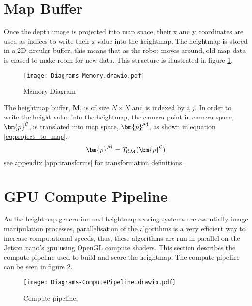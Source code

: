     \section{Map Buffer}
        Once the depth image is projected into map space, their x and y coordinates are used as indices to write their z value into the heightmap. The heightmap is stored in
        a 2D circular buffer, this means that as the robot moves around, old map data is erased to make room for new data. This structure is illustrated in figure \ref{fig:memory}.
        \begin{figure}[h]
            \centering
            \texttt{[image: Diagrams-Memory.drawio.pdf]}
            \caption{Memory Diagram}
            \label{fig:memory}
        \end{figure}

        The heightmap buffer, \(\bm{M}\), is of size \(N \times N\) and is indexed by \(i,j\). In order to write the height value into the heightmap, the camera point in camera space,
        \(\bm{p}\inrefframe{\fcamera}\), is translated into map space, \(\bm{p}\inrefframe{\fmap}\), as shown in equation \ref{eq:project_to_map},
        \begin{equation} \label{eq:project_to_map}
            \bm{p}\inrefframe{\fmap} = \transframe{\bm{p}\inrefframe{\fcamera}}{\fcamera}{\fmap}
        \end{equation}
        see appendix \ref{app:transforms} for transformation definitions.

    \newpage
    \section{GPU Compute Pipeline}
        As the heightmap generation and heightmap scoring systems are essentially image manipulation processes, parallelisation of the algorithms
        is a very efficient way to increase computational speeds, thus, these algorithms are run in parallel on the Jetson nano's \ac{gpu} using OpenGL
        compute shaders. This section describes the compute pipeline used to build and score the heightmap. The compute pipeline can be seen in
        figure \ref{fig:compute_pipe}.
        \begin{figure}[h]
            \centering
            \texttt{[image: Diagrams-ComputePipeline.drawio.pdf]}
            \caption{Compute pipeline.}
            \label{fig:compute_pipe}
        \end{figure}
    
